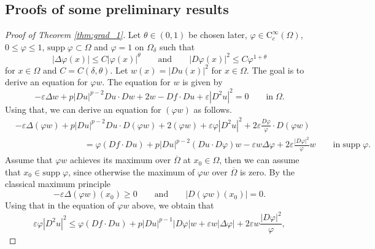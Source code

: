 \documentclass[11pt,reqno]{amsart}
\numberwithin{figure}{section}
\theoremstyle{plain}
\theoremstyle{remark}
\numberwithin{equation}{section}
\begin{document}
\begin{appendices}
\section{Proofs of some preliminary results}
\begin{proof}[Proof of Theorem \ref{thm:grad_1}] Let $\theta\in (0,1)$ be chosen later, $\varphi\in \mathrm{C}_c^\infty(\Omega)$, $0\leq \varphi\leq 1$, $\mathrm{supp}\;\varphi\subset \Omega$ and $\varphi = 1$ on $\Omega_\delta$ such that
\begin{equation}\label{e:ass_power}
    |\Delta \varphi(x)| \leq C|\varphi(x)|^\theta \qquad\text{and}\qquad |D \varphi(x)|^2 \leq C\varphi^{1+\theta}
\end{equation}
for $x\in \Omega$ and $C = C(\delta,\theta)$.
Let $w(x) = |Du(x)|^2$ for $x\in \Omega$. The goal is to derive an equation for $\varphi w$. The equation for $w$ is given by
\begin{equation*}
    -\varepsilon \Delta w + p|D u|^{p-2}D u \cdot D w + 2  w - D f\cdot D u + \varepsilon |D^2u|^2 = 0 \qquad\text{in}\;\Omega.
\end{equation*}
Using that, we can derive an equation for $(\varphi w)$ as follows.
\begin{align*}
    &-\varepsilon \Delta (\varphi w) + p|D u|^{p-2}D u \cdot D (\varphi w) + 2  (\varphi w) + \varepsilon \varphi|D^2u|^2 + 2\varepsilon \frac{D \varphi}{\varphi}\cdot D (\varphi w) \\
    &\qquad\qquad\qquad\qquad = \varphi(D f\cdot D u) + p|D u|^{p-2}(D u\cdot D \varphi)w -\varepsilon w \Delta \varphi + 2\varepsilon \frac{|D \varphi|^2}{\varphi}w
    \qquad\text{in}\;\mathrm{supp}\;\varphi.
\end{align*}
Assume that $\varphi w$ achieves its maximum over $\overline{\Omega}$ at $x_0\in \Omega$, then we can assume that $x_0\in \mathrm{supp}\;\varphi$, since otherwise the maximum of $\varphi w$ over $\overline{\Omega}$ is zero. By the classical maximum principle 
\begin{equation*}
    -\varepsilon \Delta(\varphi w)(x_0)\geq 0 \qquad\text{and}\qquad |D(\varphi w)(x_0)| = 0.
\end{equation*}
Using that in the equation of $\varphi w$ above, we obtain that
\begin{equation*}
    \varepsilon \varphi|D^2u|^2 \leq  \varphi (Df\cdot Du)+ p|Du|^{p-1} |D\varphi|w + \varepsilon w |\Delta\varphi|  + 2\varepsilon  w\frac{|D\varphi|^2}{\varphi},
\end{equation*}

\end{proof}
\end{appendices}
\end{document}
